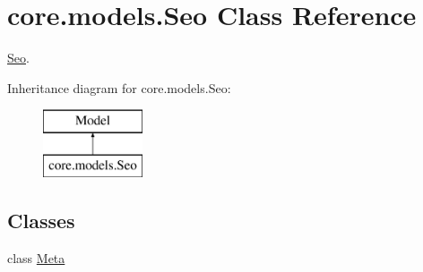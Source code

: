 \hypertarget{classcore_1_1models_1_1Seo}{\section{core.\-models.\-Seo Class Reference}
\label{classcore_1_1models_1_1Seo}
}


\hyperlink{classcore_1_1models_1_1Seo}{Seo}.  


Inheritance diagram for core.\-models.\-Seo\-:\begin{figure}[H]
\begin{center}
\leavevmode
\includegraphics[height=2.000000cm]{classcore_1_1models_1_1Seo}
\end{center}
\end{figure}
\subsection*{Classes}
\begin{DoxyCompactItemize}
\item 
class \hyperlink{classcore_1_1models_1_1Seo_1_1Meta}{Meta}
\end{DoxyCompactItemize}
